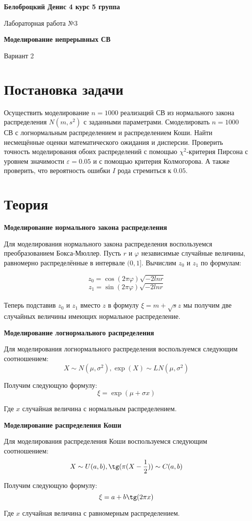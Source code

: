 \documentclass[12pt]{article}
\begin{document}
\textbf{Белоброцкий Денис 4 курс 5 группа}
\\
\begin{center}
	{\Large Лабораторная работа №3}
\end{center} 
\begin{center}
	{\large \textbf{Моделирование непрерывных СВ}}
\end{center} 
\begin{center}
	Вариант 2
\end{center}

	\section*{Постановка задачи}
	\par Осуществить моделирование $ n = 1000 $ реализаций СВ из нормального закона распределения $ N(m, s^2) $ с заданными параметрами. Смоделировать $ n = 1000 $ СВ с логнормальным распределением и распределением Коши. Найти несмещённые оценки математического ожидания и дисперсии. Проверить точность моделирования обоих распределений с помощью $ \chi^2 $-критерия Пирсона с уровнем значимости $ \varepsilon = 0.05 $ и с помощью критерия Колмогорова. А также проверить, что вероятность ошибки $ I $ рода стремиться к $ 0.05 $.
	\section*{Теория}
	\par \textbf{Моделирование нормального закона распределения} 
	\par Для моделирования нормального закона распределения воспользуемся преобразованием Бокса-Мюллер. Пусть $ r $ и $ \varphi $ независимые случайные величины, равномерно распределённые в интервале $ (0,1] $. Вычислим $ z_0 $ и $ z_1 $ по формулам: \par
	$$ z_0 = \cos(2 \pi \varphi) \sqrt{-2lnr} $$
	$$ z_1 = \sin(2 \pi \varphi) \sqrt{-2lnr} $$
	\\ Теперь подставив $ z_0 $ и $ z_1 $ вместо $ z $ в формулу $ \xi = m + \sqrt{s} z $ мы получим две случайных величины имеющих нормальное распределение.
	\par \textbf{Моделирование логнормального распределения}	
	\par Для моделирования логнормального распределения воспользуемся следующим соотношением:
	$$ X \sim N(\mu, \sigma^2), \exp(X) \sim LN(\mu, \sigma^2) $$ 
	\par Получим следующую формулу:
	$$ \xi = \exp(\mu + \sigma x)$$
	\par Где $ x $ случайная величина с нормальным распределением.
	\par \textbf{Моделирование распределения Коши}
	\par Для моделирования распределения Коши воспользуемся следующим соотношением:
	$$  X \sim U(a, b), \tg(\pi(X-\frac{1}{2})) \sim C(a, b) $$ 
	\par Получим следующую формулу:
	$$ \xi = a + b \tg(2 \pi x)$$
	\par Где $ x $ случайная величина с равномерным распределением.
	\pagebreak
	
\end{document}
